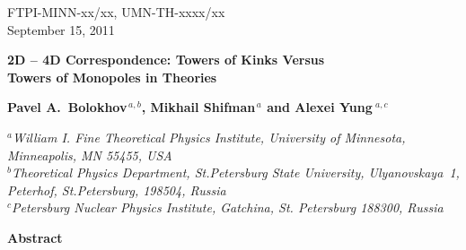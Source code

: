 \documentclass[epsfig,12pt]{article}
\begin{document}



\begin{titlepage}

\begin{flushright}
FTPI-MINN-xx/xx, UMN-TH-xxxx/xx\\
September 15, 2011
\end{flushright}

\vspace{1.1cm}

\begin{center}
{  \Large \bf  
			2D -- 4D Correspondence: Towers of Kinks Versus\\[1mm]  Towers of Monopoles
			in  Theories
			
}
\end{center}
\vspace{0.6cm}

\begin{center}

 {\large
 \bf   Pavel A.~Bolokhov$^{\,a,b}$,  Mikhail Shifman$^{\,a}$ and \bf Alexei Yung$^{\,\,a,c}$}
\end {center}

\begin{center}

$^a${\it  William I. Fine Theoretical Physics Institute, University of Minnesota,
Minneapolis, MN 55455, USA}\\
$^b${\it Theoretical Physics Department, St.Petersburg State University, Ulyanovskaya~1, 
	 Peterhof, St.Petersburg, 198504, Russia}\\
$^{c}${\it Petersburg Nuclear Physics Institute, Gatchina, St. Petersburg
188300, Russia
}
\end{center}


\vspace{0.7cm}


\begin{center}
{\large\bf Abstract}
\end{center}

\hspace{0.3cm}
\vspace{2cm}

\end{titlepage}

\newpage
\end{document}
